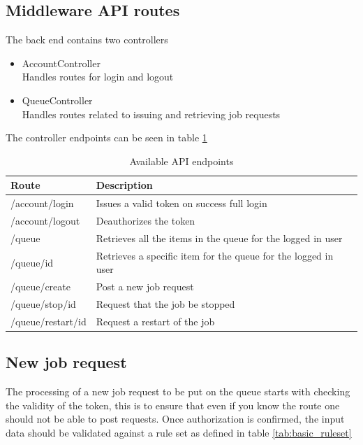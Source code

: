 \documentclass[../main.tex]{subfiles}
\begin{document}
\pagebreak\subsection*{Middleware API routes}
The back end contains two controllers
\begin{itemize}
    \item AccountController\\
            Handles routes for login and logout
    \item QueueController\\
            Handles routes related to issuing and retrieving job requests
\end{itemize}
The controller endpoints can be seen in table \ref{tab:api_endpoints}
\begin{table}[H]
    \centering
    \begin{tabular}{|l|l|}
        \hline\textbf{Route} & \textbf{Description}  \\\hline
        /account/login & Issues a valid token on success full login\\\hline
        /account/logout & Deauthorizes the token \\\hline
        /queue & Retrieves all the items in the queue for the logged in user\\\hline
        /queue/{id} & Retrieves a specific item for the queue for the logged in user \\\hline
        /queue/create & Post a new job request \\\hline
        /queue/stop/{id} & Request that the job be stopped \\\hline
        /queue/restart/{id} & Request a restart of the job \\\hline
    \end{tabular}
    \caption{Available API endpoints}
    \label{tab:api_endpoints}
\end{table}


\subsection*{New job request}
The processing of a new job request to be put on the queue starts with checking the validity of the token, this is to ensure that even if you know the route one should not be able to post requests. Once authorization is confirmed, the input data should be validated against a rule set as defined in table \ref{tab:basic_ruleset}
\end{document}

